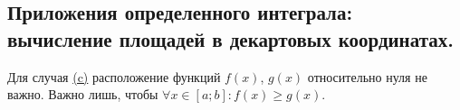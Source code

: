 \subsection{%
  Приложения определенного интеграла: вычисление площадей в декартовых
  координатах.%
}



\begin{remark}
  Для случая \hyperref[fig:int-square-3]{(c)} расположение функций
  \(f(x)\), \(g(x)\) относительно нуля не важно. Важно лишь, чтобы
  \(\forall x \in [a; b] \colon f(x) \ge g(x)\).
\end{remark}
